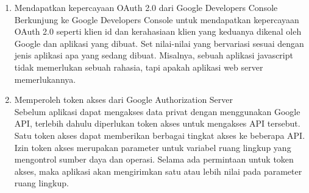 \begin{enumerate}
\item
Mendapatkan kepercayaan OAuth 2.0 dari Google Developers Console\\
Berkunjung ke Google Developers Console untuk mendapatkan kepercayaan OAuth 2.0 seperti klien id dan kerahasiaan klien yang keduanya dikenal oleh Google dan aplikasi yang dibuat. Set nilai-nilai yang bervariasi sesuai dengan jenis aplikasi apa yang sedang dibuat. Misalnya, sebuah aplikasi javascript tidak memerlukan sebuah rahasia, tapi apakah aplikasi web server memerlukannya.
\item
Memperoleh token akses dari Google Authorization Server\\
Sebelum aplikasi dapat mengakses data privat dengan menggunakan Google API, terlebih dahulu diperlukan token akses untuk mengakses API tersebut. Satu token akses dapat memberikan berbagai tingkat akses ke beberapa API. Izin token akses merupakan parameter untuk variabel ruang lingkup yang mengontrol sumber daya dan operasi. Selama ada permintaan untuk token akses, maka aplikasi akan mengirimkan satu atau lebih nilai pada parameter ruang lingkup.


\end{enumerate}
